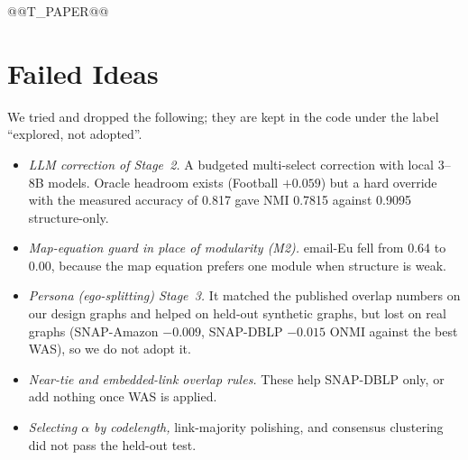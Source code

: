 \documentclass[conference]{IEEEtran}
\begin{document}
@@T_PAPER@@

\section{Failed Ideas}\label{sec:neg}
We tried and dropped the following; they are kept in the code under the label ``explored, not adopted''.
\begin{itemize}
\item \emph{LLM correction of Stage~2.} A budgeted multi-select correction with local 3--8B models. Oracle headroom exists (Football $+0.059$) but a hard override with the measured accuracy of 0.817 gave NMI 0.7815 against 0.9095 structure-only.
\item \emph{Map-equation guard in place of modularity (M2).} email-Eu fell from 0.64 to 0.00, because the map equation prefers one module when structure is weak.
\item \emph{Persona (ego-splitting) Stage~3.} It matched the published overlap numbers on our design graphs and helped on held-out synthetic graphs, but lost on real graphs (SNAP-Amazon $-0.009$, SNAP-DBLP $-0.015$ ONMI against the best WAS), so we do not adopt it.
\item \emph{Near-tie and embedded-link overlap rules.} These help SNAP-DBLP only, or add nothing once WAS is applied.
\item \emph{Selecting $\alpha$ by codelength,} link-majority polishing, and consensus clustering did not pass the held-out test.
\end{itemize}
\end{document}
